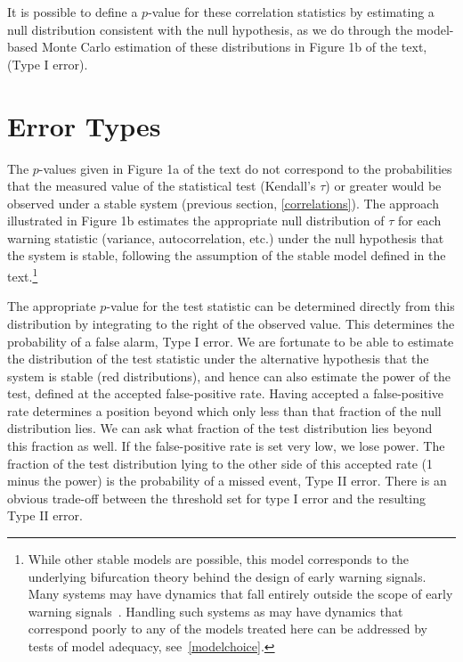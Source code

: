 \documentclass[authoryear, preprint,review,12pt]{elsarticle}
\begin{document}
It is possible to define a $p$-value for these correlation statistics by estimating a null distribution consistent with the null hypothesis, as we do through the model-based Monte Carlo estimation of these distributions in Figure 1b of the text, (Type I error).  

\section{Error Types}\label{errortypes}
The $p$-values given in Figure 1a of the text do not correspond to the probabilities 
that the measured value of the statistical test (Kendall's $\tau$) or greater would be observed under a stable system (previous section, \ref{correlations}). 
The approach illustrated in Figure 1b estimates the appropriate null distribution of $\tau$ 
for each warning statistic (variance, autocorrelation, etc.) under the null hypothesis that the system is stable, 
following the assumption of the stable model defined in the text.\footnote{
While other stable models are possible, this model corresponds to the underlying bifurcation theory behind the design of early warning signals.
Many systems may have dynamics that fall entirely outside the scope of early warning signals~\cite{Hastings2010}. 
Handling such systems as may have dynamics that correspond poorly to any of the models treated here can be addressed by tests of model adequacy, see~\ref{modelchoice}.} 

The appropriate $p$-value for the test statistic can be determined directly from this distribution by integrating to the right of the observed value.
This determines the probability of a false alarm, Type I error.
We are fortunate to be able to estimate the distribution of the test statistic under the alternative hypothesis that the system is stable (red distributions),
and hence can also estimate the power of the test, defined at the accepted false-positive rate.
Having accepted a false-positive rate determines a position beyond which only less than that fraction of the null distribution lies. 
We can ask what fraction of the test distribution lies beyond this fraction as well.
If the false-positive rate is set very low, we lose power. 
The fraction of the test distribution lying to the other side of this accepted rate (1 minus the power) is the probability of a missed event, Type II error.
There is an obvious trade-off between the threshold set for type I error and the resulting Type II error.  
\end{document}
